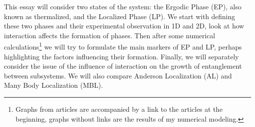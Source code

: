 This essay will consider two states of the system: the Ergodic Phase (EP), also known as thermalized, and the Localized Phase (LP). We start with defining these two phases and their experimental observation in 1D and 2D, look at how interaction affects the formation of phases. Then after some numerical calculations\footnote{
	Graphs from articles are accompanied by a link to the articles at the beginning, graphs without links are the results of my numerical modeling.
} we will try to formulate the main markers of EP and LP, perhaps highlighting the factors influencing their formation. Finally, we will separately consider the issue of the influence of interaction on the growth of entanglement between subsystems. We will also compare Anderson Localization (AL) and Many Body Localization (MBL). 




